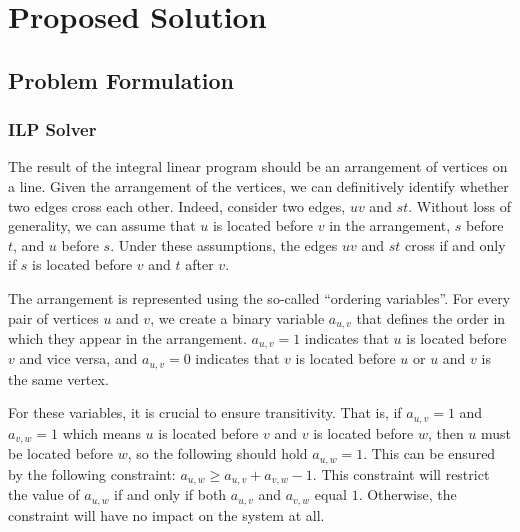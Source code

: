 \chapter{Proposed Solution}


\section{Problem Formulation}

\subsection{ILP Solver}\label{subsec:ILP-def}

The result of the integral linear program should be an arrangement of vertices on a line.
Given the arrangement of the vertices, we can definitively identify whether two edges cross each other.
Indeed, consider two edges, $uv$ and $st$.
Without loss of generality, we can assume that $u$ is located before $v$ in the arrangement, $s$ before $t$, and $u$ before $s$.
Under these assumptions, the edges $uv$ and $st$ cross if and only if $s$ is located before $v$ and $t$ after $v$.

The arrangement is represented using the so-called ``ordering variables''.
For every pair of vertices $u$ and $v$, we create a binary variable $a_{u, v}$ that defines the order in which they appear in the arrangement.
$a_{u, v} = 1$ indicates that $u$ is located before $v$ and vice versa, and $a_{u, v} = 0$ indicates that $v$ is located before $u$ or $u$ and $v$ is the same vertex.

For these variables, it is crucial to ensure transitivity.
That is, if $a_{u, v} = 1$ and $a_{v, w} = 1$ which means $u$ is located before $v$ and $v$ is located before $w$, then $u$ must be located before $w$, so the following should hold $a_{u, w} = 1$.
This can be ensured by the following constraint: $a_{u, w} \geqslant a_{u, v} + a_{v, w} - 1$.
This constraint will restrict the value of $a_{u, w}$ if and only if both $a_{u, v}$ and $a_{v, w}$ equal $1$.
Otherwise, the constraint will have no impact on the system at all.

